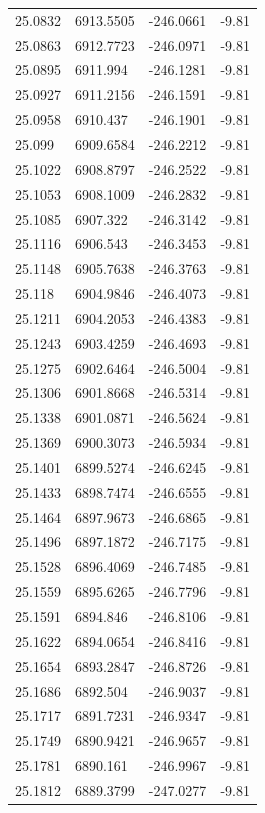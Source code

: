 \begin{table}[H]
\begin{tabular}{llll}
25.0832 & 6913.5505 & -246.0661 & -9.81 \\
25.0863 & 6912.7723 & -246.0971 & -9.81 \\
25.0895 & 6911.994 & -246.1281 & -9.81 \\
25.0927 & 6911.2156 & -246.1591 & -9.81 \\
25.0958 & 6910.437 & -246.1901 & -9.81 \\
25.099 & 6909.6584 & -246.2212 & -9.81 \\
25.1022 & 6908.8797 & -246.2522 & -9.81 \\
25.1053 & 6908.1009 & -246.2832 & -9.81 \\
25.1085 & 6907.322 & -246.3142 & -9.81 \\
25.1116 & 6906.543 & -246.3453 & -9.81 \\
25.1148 & 6905.7638 & -246.3763 & -9.81 \\
25.118 & 6904.9846 & -246.4073 & -9.81 \\
25.1211 & 6904.2053 & -246.4383 & -9.81 \\
25.1243 & 6903.4259 & -246.4693 & -9.81 \\
25.1275 & 6902.6464 & -246.5004 & -9.81 \\
25.1306 & 6901.8668 & -246.5314 & -9.81 \\
25.1338 & 6901.0871 & -246.5624 & -9.81 \\
25.1369 & 6900.3073 & -246.5934 & -9.81 \\
25.1401 & 6899.5274 & -246.6245 & -9.81 \\
25.1433 & 6898.7474 & -246.6555 & -9.81 \\
25.1464 & 6897.9673 & -246.6865 & -9.81 \\
25.1496 & 6897.1872 & -246.7175 & -9.81 \\
25.1528 & 6896.4069 & -246.7485 & -9.81 \\
25.1559 & 6895.6265 & -246.7796 & -9.81 \\
25.1591 & 6894.846 & -246.8106 & -9.81 \\
25.1622 & 6894.0654 & -246.8416 & -9.81 \\
25.1654 & 6893.2847 & -246.8726 & -9.81 \\
25.1686 & 6892.504 & -246.9037 & -9.81 \\
25.1717 & 6891.7231 & -246.9347 & -9.81 \\
25.1749 & 6890.9421 & -246.9657 & -9.81 \\
25.1781 & 6890.161 & -246.9967 & -9.81 \\
25.1812 & 6889.3799 & -247.0277 & -9.81 \\

\end{tabular}
\end{table}
